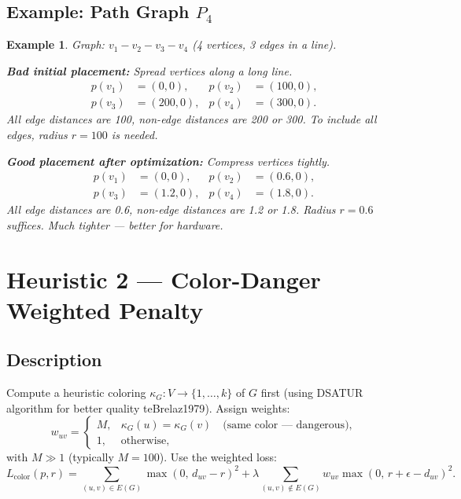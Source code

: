 \documentclass[11pt]{article}
\newtheorem{example}[theorem]{Example}
\begin{document}
\subsection{Example: Path Graph $P_4$}

\begin{example}
Graph: $v_1 - v_2 - v_3 - v_4$ (4 vertices, 3 edges in a line).

\medskip\noindent
\textbf{Bad initial placement:} Spread vertices along a long line.
\begin{align*}
  p(v_1) &= (0, 0), & p(v_2) &= (100, 0),\\
  p(v_3) &= (200, 0), & p(v_4) &= (300, 0).
\end{align*}
All edge distances are 100, non-edge distances are 200 or 300. To include all
edges, radius $r = 100$ is needed.

\medskip\noindent
\textbf{Good placement after optimization:} Compress vertices tightly.
\begin{align*}
  p(v_1) &= (0, 0), & p(v_2) &= (0.6, 0),\\
  p(v_3) &= (1.2, 0), & p(v_4) &= (1.8, 0).
\end{align*}
All edge distances are 0.6, non-edge distances are 1.2 or 1.8. Radius $r = 0.6$
suffices. Much tighter — better for hardware.
\end{example}

\newpage

\section{Heuristic 2 — Color-Danger Weighted Penalty}

\subsection{Description}

Compute a heuristic coloring $\kappa_G : V \to \{1,\dots,k\}$ of $G$ first
(using DSATUR algorithm for better quality 	te{Brelaz1979}). Assign weights:
\[
  w_{uv} =
  \begin{cases}
    M, & \kappa_G(u) = \kappa_G(v) \quad \text{(same color — dangerous)},\\
    1, & \text{otherwise},
  \end{cases}
\]
with $M \gg 1$ (typically $M = 100$). Use the weighted loss:
\[
  L_{\mathrm{color}}(p,r)
  =
  \sum_{(u,v)\in E(G)} \max(0,\, d_{uv} - r)^2
  +
  \lambda \sum_{(u,v)\notin E(G)}
  w_{uv}\max(0,\, r + \epsilon - d_{uv})^2.
\]
\end{document}
